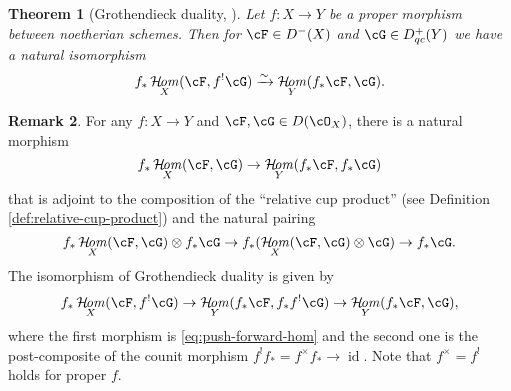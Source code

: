 \documentclass[12pt]{amsart}
\numberwithin{equation}{section}
\theoremstyle{plain}
\newtheorem{theorem}{Theorem}[section]
\theoremstyle{definition}
\newtheorem{remark}[theorem]{Remark}
\DeclareMathOperator{\CHom}{\mathcal{H}\!\mathit{om}}
\DeclareMathOperator{\id}{\mathrm{id}}
\begin{document}
\begin{theorem}[Grothendieck duality, {\cite[\href{https://stacks.math.columbia.edu/tag/0AU3}{Tag 0AU3}]{stacks-project}}]\label{grothendieck_duality}
    Let $f \colon X \to Y$ be a proper morphism between noetherian schemes.
    Then for $\cF \in D^-(X)$ and $\cG \in D_{qc}^+(Y)$ we have a natural isomorphism
    \begin{equation}\label{eq:grothendieck_duality}
        f_*\CHom_X(\cF, f^!\cG) \xrightarrow{\sim} \CHom_Y(f_*\cF, \cG).
    \end{equation}

\end{theorem}
\begin{remark}\label{remark:grothendieck-duality-isomorphism}
    For any $f \colon X \to Y$ and $\cF, \cG \in D(\cO_X)$, there is a natural morphism
    \begin{equation}\label{eq:push-forward-hom}
        f_*\CHom_X(\cF, \cG) \to \CHom_Y(f_*\cF, f_*\cG)
    \end{equation}
    that is adjoint to the composition of the ``relative cup product'' (see Definition \ref{def:relative-cup-product}) and the natural pairing
    \begin{equation}
        f_*\CHom_X(\cF, \cG) \otimes f_*\cG \to f_*(\CHom_X(\cF, \cG) \otimes \cG) \to f_*\cG.
    \end{equation}
    The isomorphism of Grothendieck duality is given by
    \begin{equation}
        f_*\CHom_X(\cF, f^!\cG) \to \CHom_Y(f_*\cF, f_*f^!\cG) \to \CHom_Y(f_*\cF, \cG),
    \end{equation}
    where the first morphism is \eqref{eq:push-forward-hom} and the second one is the post-composite of the counit morphism $f^!f_*=f^\times f_* \to \id$.
    Note that $f^\times = f^!$ holds for proper $f$.
\end{remark}
\end{document}
